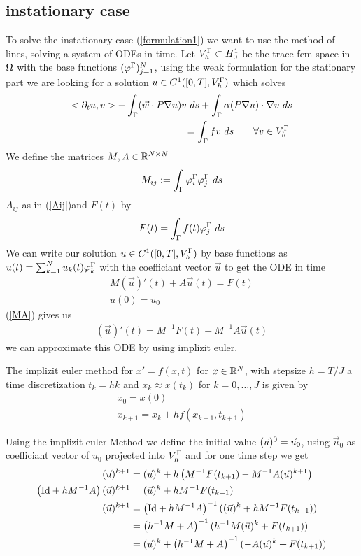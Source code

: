 \subsection{instationary case}
To solve the instationary case (\ref{formulation1}) we want to use the method of lines, solving a system of ODEs in time. Let $V^\Gamma_h\subset H^1_0$ be the trace fem space in $\Omega$ with the base functions $(\varphi^\Gamma)_{j=1}^N$, using the weak formulation for the stationary part we are looking for a solution $u\in C^1([0,T],V^\Gamma_h)$ which solves
\begin{align}
<\partial_t u,v> 
+\int_\Gamma ( \vec w \cdot P\nabla u) v\ ds
+ \int_\Gamma \alpha (P \nabla u) \cdot \nabla v\ ds \nonumber
\\= \int_\Gamma f v\ ds \qquad \forall v \in V^\Gamma_h\
\end{align}
We define the matrices $M,A \in \mathbb{R}^{N\times N}$
\begin{align*}
M_{ij}:= \int_\Gamma \varphi^\Gamma_i \varphi^\Gamma_j\ ds
\end{align*}
$A_{ij}$ as in (\ref{Aij})and $F(t)$ by
\begin{align*}
F(t)=\int_\Gamma f(t) \varphi^\Gamma_j\ ds
\end{align*}
We can write our solution $u\in C^1([0,T],V^\Gamma_h)$ by base functions as $u(t)=\sum_{k=1}^N u_k(t) \varphi^\Gamma_k$ with the coefficiant vector $\vec u$ to get the ODE in time
\begin{subequations}
\begin{align}
\label{MA}
M(\vec u)'(t)+A\vec u(t)=F(t)\\
u(0)=u_0
\end{align}
\end{subequations}
(\ref{MA}) gives us
\begin{align}
(\vec u)'(t)=M^{-1}F(t)-M^{-1}A\vec u(t)
\end{align}
we can approximate this ODE by using implizit euler. 
\begin{rmk}
The implizit euler method for $x'=f(x,t)$ for $x\in\mathbb{R}^N$, with stepsize $h=T/J$ a time discretization $t_k=hk$ and $x_k\approx x(t_k)$ for $k=0,\dots,J$ is given by
\begin{align*}
x_0=x(0)\\
x_{k+1}=x_k+h f(x_{k+1},t_{k+1})
\end{align*}
\end{rmk}
Using the implizit euler Method we define the initial value $(\vec u)^0=\vec u_0$, using $\vec u_0$ as coefficiant vector of $u_0$ projected into $V^\Gamma_h$ and for one time step we get
\begin{align*}
(\vec u)^{k+1}&=(\vec u)^k+h\left(M^{-1}F(t_{k+1})-M^{-1}A(\vec u)^{k+1}\right)\\
\left(\text{Id} + hM^{-1}A \right)(\vec u)^{k+1}&=(\vec u)^k+hM^{-1}F(t_{k+1})\\
(\vec u)^{k+1}&=\left(\text{Id} + hM^{-1}A \right)^{-1}((\vec u)^k+hM^{-1}F(t_{k+1}))\\
&=\left(h^{-1}M+A \right)^{-1}(h^{-1}M(\vec u)^k+F(t_{k+1}))\\
&=(\vec u)^k + \left(h^{-1}M+A \right)^{-1}(-A(\vec u)^k+F(t_{k+1}))\\
\end{align*}